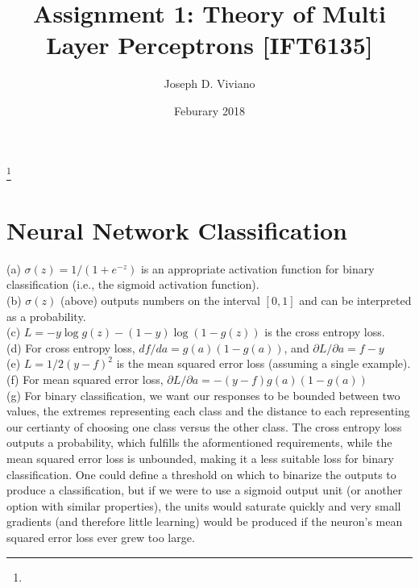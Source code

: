 \documentclass{amsart}
\theoremstyle{definition}
\theoremstyle{remark}
\numberwithin{equation}{section}
\begin{document}
\title{Assignment 1: Theory of Multi Layer Perceptrons [IFT6135]}

\author{Joseph D. Viviano}
\address{Universit\'e de Montr\'eal}
\curraddr{}
\thanks{}
\date{Feburary 2018}

\maketitle

\section{Neural Network Classification}

%
(a) $\sigma(z) = 1/(1 + e^{-z})$ is an appropriate activation function for binary
classification (i.e., the sigmoid activation function). \\

(b) $\sigma(z)$ (above) outputs numbers on the interval $[0, 1]$ and can be
interpreted as a probability. \\

(c) $L= -y\log g(z) - (1-y)\log(1-g(z))$ is the cross entropy loss. \\

(d) For cross entropy loss, $df/da=g(a)(1-g(a))$, and $\partial L/\partial a = f-y$ \\

(e) $L=1/2(y-f)^2$ is the mean squared error loss (assuming a single example). \\

(f) For mean squared error loss, $\partial L/\partial a = -(y-f)g(a)(1-g(a))$ \\

(g) For binary classification, we want our responses to be bounded between two
values, the extremes representing each class and the distance to each
representing our certianty of choosing one class versus the other class. The
cross entropy loss outputs a probability, which fulfills the aformentioned
requirements, while the mean squared error loss is unbounded, making it a less
suitable loss for binary classification. One could define a threshold on which
to binarize the outputs to produce a classification, but if we were to use
a sigmoid output unit (or another option with similar properties), the units
would saturate quickly and very small gradients (and therefore little learning)
would be produced if the neuron's mean squared error loss ever grew too large. \\
\end{document}
